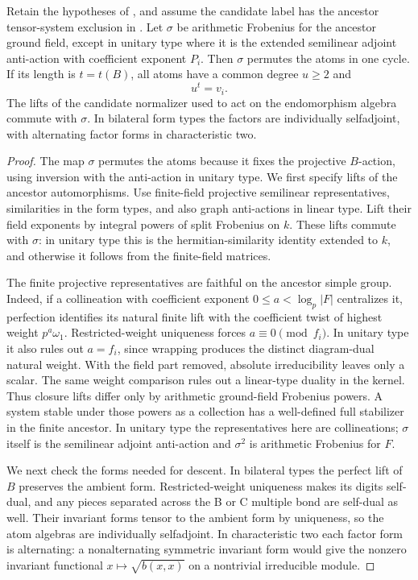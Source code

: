 \begin{lemma}\label{w:atom-cycle}
Retain the hypotheses of , and assume the candidate label has the ancestor tensor-system exclusion in . Let $\sigma$ be arithmetic Frobenius for the ancestor ground field, except in unitary type where it is the extended semilinear adjoint anti-action with coefficient exponent $P_i$. Then $\sigma$ permutes the atoms in one cycle. If its length is $t=t(B)$, all atoms have a common degree $u\ge2$ and
\[
 u^t=v_i.
\]
The lifts of the candidate normalizer used to act on the endomorphism algebra commute with $\sigma$. In bilateral form types the factors are individually selfadjoint, with alternating factor forms in characteristic two.
\end{lemma}
\begin{proof}
The map $\sigma$ permutes the atoms because it fixes the projective
$B$-action, using inversion with the anti-action in unitary type. We
first specify lifts of the ancestor automorphisms. Use finite-field
projective semilinear representatives, similarities in the form types,
and also graph anti-actions in linear type. Lift their field exponents
by integral powers of split Frobenius on $k$. These lifts commute with
$\sigma$: in unitary type this is the hermitian-similarity identity
extended to $k$, and otherwise it follows from the finite-field matrices.

The finite projective representatives are faithful on the ancestor
simple group. Indeed, if a collineation with coefficient exponent
$0\le a<\log_p|F|$ centralizes it, perfection identifies its natural
finite lift with the coefficient twist of highest weight $p^a\omega_1$.
Restricted-weight uniqueness forces $a\equiv0\pmod{f_i}$. In unitary
type it also rules out $a=f_i$, since wrapping produces the distinct
diagram-dual natural weight. With the field part removed, absolute
irreducibility leaves only a scalar. The same weight comparison rules
out a linear-type duality in the kernel. Thus closure lifts differ only
by arithmetic ground-field Frobenius powers. A system stable under those
powers as a collection has a well-defined full stabilizer in the finite
ancestor. In unitary type the representatives here are collineations;
$\sigma$ itself is the semilinear adjoint anti-action and $\sigma^2$ is
arithmetic Frobenius for $F$.

We next check the forms needed for descent. In bilateral types the
perfect lift of $B$ preserves the ambient form. Restricted-weight
uniqueness makes its digits self-dual, and any pieces separated across
the B or C multiple bond are self-dual as well. Their invariant forms
tensor to the ambient form by uniqueness, so the atom algebras are
individually selfadjoint. In characteristic two each factor form is
alternating: a nonalternating symmetric invariant form would give the
nonzero invariant functional $x\mapsto\sqrt{b(x,x)}$ on a nontrivial
irreducible module.


\end{proof}
